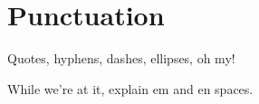 \chapter{Punctuation}
\label{punctuation}

Quotes, hyphens, dashes, ellipses, oh my!

While we're at it, explain em and en spaces.
